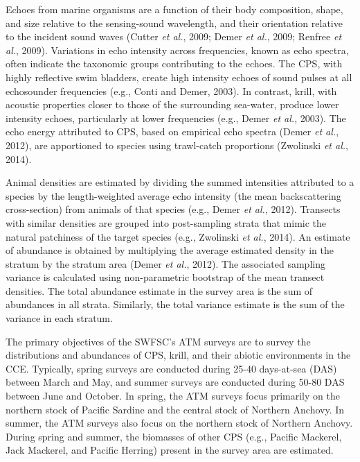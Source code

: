 \documentclass[]{article}
\begin{document}
\newpage

Echoes from marine organisms are a function of their body composition, shape, and size relative to the sensing-sound wavelength, and their orientation relative to the incident sound waves (Cutter \emph{et al.}, 2009; Demer \emph{et al.}, 2009; Renfree \emph{et al.}, 2009). Variations in echo intensity across frequencies, known as echo spectra, often indicate the taxonomic groups contributing to the echoes. The CPS, with highly reflective swim bladders, create high intensity echoes of sound pulses at all echosounder frequencies (e.g., Conti and Demer, 2003). In contrast, krill, with acoustic properties closer to those of the surrounding sea-water, produce lower intensity echoes, particularly at lower frequencies (e.g., Demer \emph{et al.}, 2003). The echo energy attributed to CPS, based on empirical echo spectra (Demer \emph{et al.}, 2012), are apportioned to species using trawl-catch proportions (Zwolinski \emph{et al.}, 2014).

Animal densities are estimated by dividing the summed intensities attributed to a species by the length-weighted average echo intensity (the mean backscattering cross-section) from animals of that species (e.g., Demer \emph{et al.}, 2012). Transects with similar densities are grouped into post-sampling strata that mimic the natural patchiness of the target species (e.g., Zwolinski \emph{et al.}, 2014). An estimate of abundance is obtained by multiplying the average estimated density in the stratum by the stratum area (Demer \emph{et al.}, 2012). The associated sampling variance is calculated using non-parametric bootstrap of the mean transect densities. The total abundance estimate in the survey area is the sum of abundances in all strata. Similarly, the total variance estimate is the sum of the variance in each stratum.

The primary objectives of the SWFSC's ATM surveys are to survey the distributions and abundances of CPS, krill, and their abiotic environments in the CCE. Typically, spring surveys are conducted during 25-40 days-at-sea (DAS) between March and May, and summer surveys are conducted during 50-80 DAS between June and October. In spring, the ATM surveys focus primarily on the northern stock of Pacific Sardine and the central stock of Northern Anchovy. In summer, the ATM surveys also focus on the northern stock of Northern Anchovy. During spring and summer, the biomasses of other CPS (e.g., Pacific Mackerel, Jack Mackerel, and Pacific Herring) present in the survey area are estimated.
\end{document}
